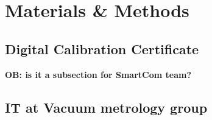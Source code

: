 \documentclass[3p,times,procedia]{elsarticle}
\begin{document}
\section{Materials \& Methods}

\subsection{Digital Calibration Certificate}
    
\textbf{OB: is it a subsection for SmartCom team?}

\subsection{IT at Vacuum metrology group}
\end{document}
